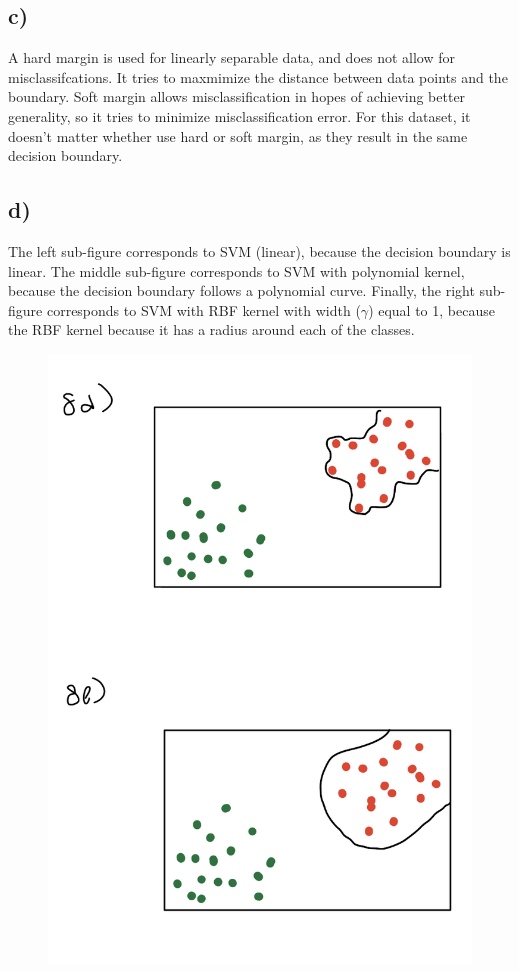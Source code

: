\documentclass[12pt, letterpaper]{article}
\begin{document}
\subsection*{c)} A hard margin is used for linearly separable data, and does not allow for misclassifcations. It tries to maxmimize the distance between data points and the boundary. Soft margin allows misclassification in hopes of achieving better generality, so it tries to minimize misclassification error. For this dataset, it doesn't matter whether use hard or soft margin, as they result in the same decision boundary.

\subsection*{d)} The left sub-figure corresponds to SVM (linear), because the decision boundary is linear. The middle sub-figure corresponds to SVM with polynomial kernel, because the decision boundary follows a polynomial curve. Finally, the right sub-figure corresponds to SVM with RBF kernel with width ($\gamma$) equal to 1, because the RBF kernel because it has a radius around each of the classes.
\begin{figure}[h!]
  \includegraphics[scale=0.33]{./images/8ef.jpeg}
\end{figure}
\clearpage
\end{document}
